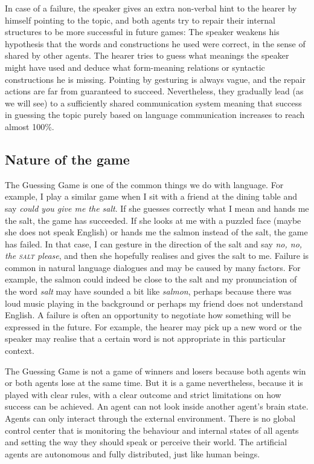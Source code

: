 In case of a failure, the speaker gives an extra non-verbal
hint to the hearer by himself pointing to the topic, 
and both agents try to repair
their internal structures to be more successful in future
games: The speaker weakens his hypothesis that the words
and constructions he used 
were correct, in the sense of shared by other agents. 
The hearer tries to guess what meanings the speaker 
might have used and deduce what form-meaning relations or 
syntactic constructions he is missing. Pointing by gesturing is
always vague, and the repair actions are far from guaranteed to succeed. 
Nevertheless, they gradually lead (as we will see) to 
a sufficiently shared communication system meaning that 
success in guessing the topic purely based on language
communication increases to reach almost 100\%. 

\subsection{Nature of the game}

The Guessing Game is one of the common things we do with language. 
For example, I play a similar game when I sit with a friend
at the dining table and say \textit{could you give me the salt}. 
If she guesses correctly what I mean and hands 
me the salt, the game has succeeded. If she looks at me 
with a puzzled face (maybe she does not speak English) or hands me
the salmon instead of the salt, the game has failed. In that case, 
I can gesture in the direction of the salt and say \textit{no, no, the {\scshape salt}
please}, and then she hopefully realises and gives the salt to me. Failure 
is common in natural language dialogues and may be caused by 
many factors. For example, the salmon could indeed 
be close to the salt and my pronunciation of the word \textit{salt}
may have sounded a bit like \textit{salmon}, perhaps because there was
loud music playing in the background or perhaps
my friend does not understand English. 
A failure is often 
an opportunity to negotiate how something will be expressed
in the future. For example, the hearer may pick up a new word
or the speaker may realise that a certain word is 
not appropriate in this particular context. 

The Guessing Game is not a game of winners and losers because both 
agents win or both agents lose at the same time. But it is a game
nevertheless, because it is played with clear rules, 
with a clear outcome and strict limitations on how 
success can be achieved. An agent can not look inside another
agent's brain state. Agents can only interact through the 
external environment. There is no global control 
center that is monitoring the behaviour and internal states
of all agents and setting the way they should speak or 
perceive their world. The artificial agents are autonomous and
fully distributed, just like human beings. 


